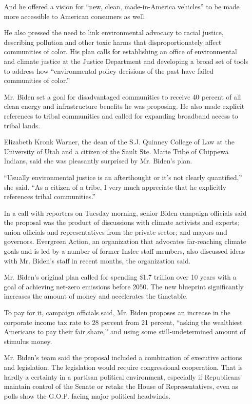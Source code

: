And he offered a vision for ``new, clean, made-in-America vehicles'' to
be made more accessible to American consumers as well.

He also pressed the need to link environmental advocacy to racial
justice, describing pollution and other toxic harms that
disproportionately affect communities of color. His plan calls for
establishing an office of environmental and climate justice at the
Justice Department and developing a broad set of tools to address how
``environmental policy decisions of the past have failed communities of
color.''

Mr. Biden set a goal for disadvantaged communities to receive 40 percent
of all clean energy and infrastructure benefits he was proposing. He
also made explicit references to tribal communities and called for
expanding broadband access to tribal lands.

Elizabeth Kronk Warner, the dean of the S.J. Quinney College of Law at
the University of Utah and a citizen of the Sault Ste. Marie Tribe of
Chippewa Indians, said she was pleasantly surprised by Mr. Biden's plan.

``Usually environmental justice is an afterthought or it's not clearly
quantified,'' she said. ``As a citizen of a tribe, I very much
appreciate that he explicitly references tribal communities.''

In a call with reporters on Tuesday morning, senior Biden campaign
officials said the proposal was the product of discussions with climate
activists and experts; union officials and representatives from the
private sector; and mayors and governors. Evergreen Action, an
organization that advocates far-reaching climate goals and is led by a
number of former Inslee staff members, also discussed ideas with Mr.
Biden's staff in recent months, the organization said.

Mr. Biden's original plan called for spending \$1.7 trillion over 10
years with a goal of achieving net-zero emissions before 2050. The new
blueprint significantly increases the amount of money and accelerates
the timetable.

To pay for it, campaign officials said, Mr. Biden proposes an increase
in the corporate income tax rate to 28 percent from 21 percent, ``asking
the wealthiest Americans to pay their fair share,'' and using some
still-undetermined amount of stimulus money.

Mr. Biden's team said the proposal included a combination of executive
actions and legislation. The legislation would require congressional
cooperation. That is hardly a certainty in a partisan political
environment, especially if Republicans maintain control of the Senate or
retake the House of Representatives, even as polls show the G.O.P.
facing major political headwinds.

